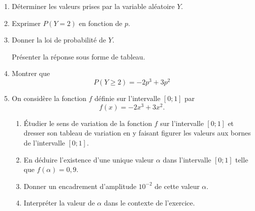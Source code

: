 	\begin{enumerate}
		\item Déterminer les valeurs prises par la variable aléatoire $Y$.

		\item Exprimer $P(Y=2)$ en fonction de $p$.

		\item Donner la loi de probabilité de $Y$.

		Présenter la réponse sous forme de tableau.

		\item Montrer que
		\[P(Y \geqslant  2)=-2 p^{3}+3 p^{2}\]

		\item On considère la fonction $f$ définie sur l'intervalle $[0 ; 1]$ par
		\[f(x)=-2 x^{3}+3 x^{2}.\]
		\begin{enumerate}
			\item Étudier le sens de variation de la fonction $f$ sur l'intervalle $[0 ; 1]$ et dresser son tableau de variation en y faisant figurer les valeurs aux bornes de l'intervalle $[0 ; 1]$.

			\item En déduire l'existence d'une unique valeur $\alpha$ dans l'intervalle $[0 ; 1]$ telle que $f(\alpha)=0,9$.

			\item Donner un encadrement d'amplitude $10^{-2}$ de cette valeur $\alpha$.

			\item Interpréter la valeur de $\alpha$ dans le contexte de l'exercice.
		\end{enumerate}
	\end{enumerate}
